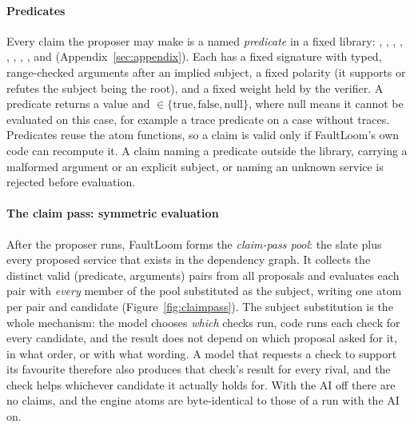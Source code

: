 \paragraph{Predicates}
{\sloppy
Every claim the proposer may make is a named \emph{predicate} in a fixed library: , , , , , , , ,  and  (Appendix~\ref{sec:appendix}).
Each has a fixed signature with typed, range-checked arguments after an implied subject, a fixed polarity (it supports or refutes the subject being the root), and a fixed weight held by the verifier.
A predicate returns a value and  $\in \{\text{true}, \text{false}, \text{null}\}$, where null means it cannot be evaluated on this case, for example a trace predicate on a case without traces.
Predicates reuse the atom functions, so a claim is valid only if FaultLoom's own code can recompute it.
A claim naming a predicate outside the library, carrying a malformed argument or an explicit subject, or naming an unknown service is rejected before evaluation.
\par}

\paragraph{The claim pass: symmetric evaluation}
After the proposer runs, FaultLoom forms the \emph{claim-pass pool}: the slate plus every proposed service that exists in the dependency graph.
It collects the distinct valid (predicate, arguments) pairs from all proposals and evaluates each pair with \emph{every} member of the pool substituted as the subject, writing one  atom per pair and candidate (Figure~\ref{fig:claimpass}).
The subject substitution is the whole mechanism: the model chooses \emph{which} checks run, code runs each check for every candidate, and the result does not depend on which proposal asked for it, in what order, or with what wording.
A model that requests a check to support its favourite therefore also produces that check's result for every rival, and the check helps whichever candidate it actually holds for.
With the AI off there are no claims, and the engine atoms are byte-identical to those of a run with the AI on.


